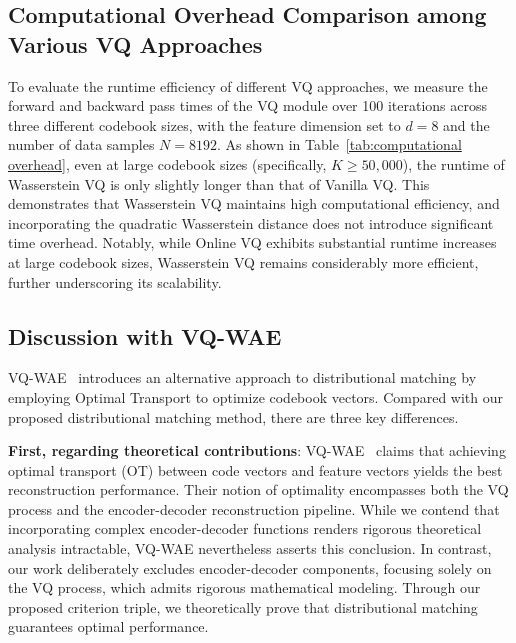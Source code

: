 \subsection{Computational Overhead Comparison among Various VQ Approaches}
\label{appendix:computational overhead}
To evaluate the runtime efficiency of different VQ approaches, we measure the forward and backward pass times of the VQ module over 100 iterations across three different codebook sizes, with the feature dimension set to $d=8$ and the number of data samples $N=8192$. As shown in Table~\ref{tab:computational overhead}, even at large codebook sizes (specifically, $K \geq 50,000$), the runtime of Wasserstein VQ is only slightly longer than that of Vanilla VQ. This demonstrates that Wasserstein VQ maintains high computational efficiency, and incorporating the quadratic Wasserstein distance does not introduce significant time overhead. Notably, while Online VQ exhibits substantial runtime increases at large codebook sizes, Wasserstein VQ remains considerably more efficient, further underscoring its scalability.

\subsection{Discussion with VQ-WAE~\cite{Vuong2023VectorQW}}
\label{appendix:VQ-WAE}
VQ-WAE~\cite{Vuong2023VectorQW} introduces an alternative approach to distributional matching by employing Optimal Transport to optimize codebook vectors. Compared with our proposed distributional matching method, there are three key differences.

\textbf{First, regarding theoretical contributions}: VQ-WAE~\cite{Vuong2023VectorQW} claims that achieving optimal transport (OT) between code vectors and feature vectors yields the best reconstruction performance. Their notion of optimality encompasses both the VQ process and the encoder-decoder reconstruction pipeline. While we contend that incorporating complex encoder-decoder functions renders rigorous theoretical analysis intractable, VQ-WAE nevertheless asserts this conclusion. In contrast, our work deliberately excludes encoder-decoder components, focusing solely on the VQ process, which admits rigorous mathematical modeling. Through our proposed criterion triple, we theoretically prove that distributional matching guarantees optimal performance.

